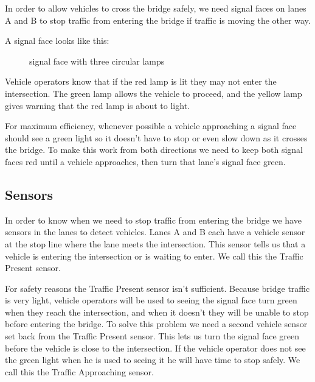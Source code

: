 \documentclass[letterpaper,twoside]{article}
\begin{document}
In order to allow vehicles to cross the bridge safely, we need signal
faces on lanes A and B to stop traffic from entering the bridge if
traffic is moving the other way.

A signal face looks like this:

\begin{figure}[H]
           {\caption{signal face with three circular lamps}
             \label{fig:signal_ccc}}
\end{figure}

Vehicle operators know that if the red lamp is lit they may not
enter the intersection.  The green lamp allows the vehicle to
proceed, and the yellow lamp gives warning that the red lamp
is about to light.

For maximum efficiency, whenever possible a vehicle approaching
a signal face should see a green light so it doesn't have to
stop or even slow down as it crosses the bridge.  To make this
work from both directions we need to keep both signal faces red
until a vehicle approaches, then turn that lane's signal face
green.

\subsection{Sensors}

In order to know when we need to stop traffic from entering the bridge
we have sensors in the lanes to detect vehicles.  Lanes A and B each
have a vehicle sensor at the stop line where the lane meets the
intersection.  This sensor tells us that a vehicle is entering
the intersection or is waiting to enter.  We call this the Traffic
Present sensor.

For safety reasons the Traffic Present sensor isn't sufficient.
Because bridge traffic is very light, vehicle operators will be
used to seeing the signal face turn green when they reach
the intersection, and when it doesn't they will be unable to stop
before entering the bridge.  To solve this problem we need a
second vehicle sensor set back from the Traffic Present sensor.
This lets us turn the signal face green before the vehicle is
close to the intersection.  If the vehicle operator does not
see the green light when he is used to seeing it he will have
time to stop safely.  We call this the Traffic Approaching sensor.
\end{document}
